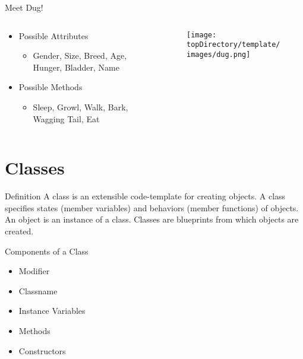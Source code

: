 \documentclass[10pt, compress]{beamer}
\begin{document}
\begin{slide}
	\begin{block}{Meet Dug!}
		\begin{columns}
			\begin{column}{0.5\textwidth}
				\begin{itemize}
					\item[] {Possible Attributes}
						\begin{itemize}
							\item[] Gender, Size, Breed, Age, Hunger, Bladder, Name
						\end{itemize}
					\item[] Possible Methods
						\begin{itemize}
							\item[] Sleep, Growl, Walk, Bark, Wagging Tail, Eat
						\end{itemize}
				\end{itemize}
			\end{column}
			\begin{column}{0.5\textwidth}
				\begin{figure}[H]\centering
					\texttt{[image: \\topDirectory/template/images/dug.png]}
				\end{figure}
			\end{column}
		\end{columns}
	\end{block}
\end{slide}

\section{Classes}

\begin{slide}
	\begin{block}{Definition}
		A class is an extensible code-template for creating objects.
		A class specifies states (member variables) and behaviors (member functions) of objects.
		An object is an instance of a class.
		Classes are blueprints from which objects are created.
	\end{block}
\end{slide}

\begin{slide}
	\begin{block}{Components of a Class}
		\begin{itemize}
			\item[] Modifier
			\item[] Classname
			\item[] Instance Variables
			\item[] Methods
			\item[] Constructors
		\end{itemize}
	\end{block}
\end{slide}
\end{document}
